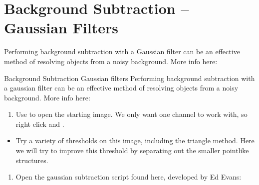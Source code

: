 \documentclass[letterpaper,10pt,english]{jupyterBook}
\begin{document}
\sphinxAtStartPar
{}

\sphinxstepscope


\chapter{Background Subtraction – Gaussian Filters}
\label{\detokenize{background-subtraction:background-subtraction-gaussian-filters}}\label{\detokenize{background-subtraction::doc}}
\sphinxAtStartPar
Performing background subtraction with a Gaussian filter can be an effective method of resolving
objects from a noisy background. More info here:

\sphinxAtStartPar
{}

\sphinxAtStartPar
Background Subtraction \sphinxhyphen{} Gaussian filters
Performing background subtraction with a gaussian filter can be an effective method of resolving
objects from a noisy background. More info here:
\begin{enumerate}
%
\item {} 
\sphinxAtStartPar
Use  to open the starting image. We only
want one channel to work with, so right click and .

\end{enumerate}
\begin{itemize}
\item {} 
\sphinxAtStartPar
Try a variety of thresholds on this image, including the triangle method. Here we
will try to improve this threshold by separating out the smaller point\sphinxhyphen{}like
structures.

\end{itemize}
\begin{enumerate}
%
\setcounter{enumi}{1}
\item {} 
\sphinxAtStartPar
Open the gaussian subtraction script found here, developed by Ed Evans:

\sphinxAtStartPar
{}

\end{enumerate}
\end{document}
